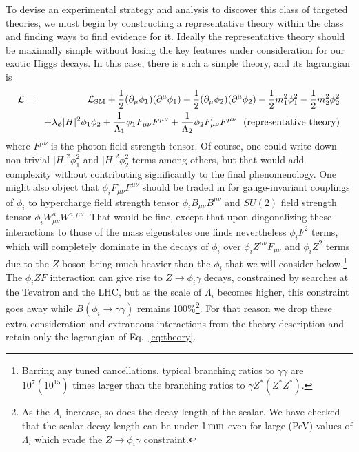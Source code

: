\documentclass[letter,12pt]{article}
\def\bea{\begin{eqnarray}}
\def\eea{\end{eqnarray}}
\begin{document}
To devise an experimental strategy and analysis to discover this class of targeted theories, we must begin by constructing a representative theory within the class and finding ways to find evidence for it. Ideally the representative theory should be maximally simple without losing the key features under consideration for our exotic Higgs decays. In this case, there is such a simple theory, and its lagrangian is
\bea
{\cal L}& = &{\cal L}_{\rm SM}+\frac{1}{2}(\partial_\mu\phi_1)(\partial^\mu\phi_1)+\frac{1}{2}(\partial_\mu\phi_2)(\partial^\mu\phi_2)-\frac{1}{2}m^2_1\phi^2_1-\frac{1}{2}m^2_2\phi^2_2 \nonumber \\
& & +\lambda_\phi |H|^2\phi_1\phi_2 
 +\frac{1}{\Lambda_1}\phi_1 F_{\mu\nu}F^{\mu\nu}+\frac{1}{\Lambda_2}\phi_2 F_{\mu\nu}F^{\mu\nu}~~{\rm (representative~theory)}
\label{eq:theory}
\eea
where $F^{\mu\nu}$ is the photon field strength tensor. Of course, one could write down non-trivial $|H|^2\phi_1^2$ and $|H|^2\phi_2^2$ terms among others, but that would add complexity without contributing significantly to the final phenomenology. One might also object that $\phi_i F_{\mu\nu}F^{\mu\nu}$ should be traded in for gauge-invariant couplings of $\phi_i$ to hypercharge field strength tensor $\phi_i B_{\mu\nu}B^{\mu\nu}$ and $SU(2)$ field strength tensor $\phi_i W^{a}_{\mu\nu}W^{a,\mu\nu}$. That would be fine, except that upon diagonalizing these interactions to those of the mass eigenstates one finds nevertheless $\phi_i F^2$ terms, which will completely dominate in the decays of $\phi_i$ over $\phi_{i}Z^{\mu\nu}F_{\mu\nu}$ and $\phi_i Z^2$ terms due to the $Z$ boson being much heavier than the $\phi_i$ that we will consider below.\footnote{Barring any tuned cancellations, typical branching ratios to $\gamma\gamma$ are $10^7(10^{15})$ times larger than the branching ratios to $\gamma Z^{*}(Z^{*}Z^{*})$.} The $\phi_iZF$ interaction can give rise to $Z\to \phi_i\gamma$ decays, constrained by searches at the Tevatron and the LHC\cite{Aaltonen:2013mfa,atlas_4_photon_search}, but as the scale of $\Lambda_i$ becomes higher, this constraint goes away while $B(\phi_i\to\gamma\gamma)$ remains 100\%\footnote{As the $\Lambda_{i}$ increase, so does the decay length of the scalar. We have checked that the scalar decay length can be under $1\,{\rm mm}$ even for large (PeV)  values of $\Lambda_{i}$ which evade the  $Z\to \phi_i\gamma$ constraint.}. For that reason we drop these extra consideration and extraneous interactions from the theory description and retain only the lagrangian of Eq.~\ref{eq:theory}.
\end{document}
